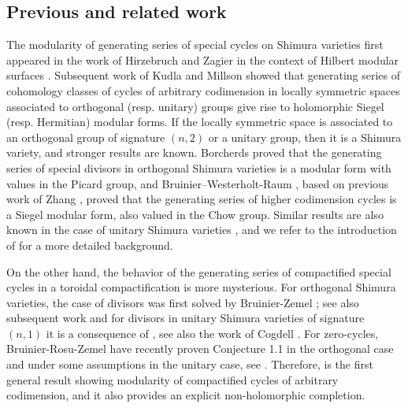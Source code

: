 \documentclass[11pt,letterpaper,english]{amsart}
\numberwithin{equation}{subsection}
\numberwithin{equation}{section}
\theoremstyle{plain}
\theoremstyle{remark}
\begin{document}
\subsection{Previous and related work}
The modularity of generating series of special cycles on Shimura varieties first appeared in the work of Hirzebruch and Zagier in the context of Hilbert modular surfaces \cite{hirzag}. Subsequent work of Kudla and Millson \cite{kudla-millson} showed that generating series of cohomology classes of cycles of arbitrary codimension in locally symmetric spaces associated to orthogonal (resp. unitary) groups give rise to holomorphic Siegel (resp. Hermitian) modular forms. If the locally symmetric space is associated to an orthogonal group of signature $(n,2)$ or a unitary group, then it is a Shimura variety, and stronger results are known. Borcherds \cite{borcherdszagier,borcherds-inventiones-automorphic} proved that the generating series of special divisors in orthogonal Shimura varieties is a modular form with values in the Picard group, and Bruinier--Westerholt-Raum \cite{Bruinier-Westerholt-Raum}, based on previous work of Zhang \cite{zhang-thesis-2009}, proved that the generating series of higher codimension cycles is a Siegel modular form, also valued in the Chow group. Similar results are also known in the case of unitary Shimura varieties \cite{xia,liu-yifeng,yuan-zhang-zhang}, and we refer to the introduction of \cite{bruinier-rosu-zemel} for a more detailed background.

On the other hand, the behavior of the generating series of compactified special cycles in a toroidal compactification is more mysterious. For orthogonal Shimura varieties, the case of divisors was first solved by Bruinier-Zemel \cite{bruinierzemel}; see also subsequent work \cite{engel-greer-tayou,garcia-modularity} and for divisors in unitary Shimura varieties of signature $(n,1)$ it is a consequence of \cite{bruinier-howard-kudla-yang}, see also the work of Cogdell \cite{Cogdell-Picard-modular}. For zero-cycles, Bruinier-Rosu-Zemel \cite{bruinier-rosu-zemel} have recently proven Conjecture 1.1 in the orthogonal case and under some assumptions in the unitary case, see \cite[Theorems 1.2, 1.3, 1.4]{bruinier-rosu-zemel}. Therefore,  is the first general result showing modularity of compactified cycles of arbitrary codimension, and it also provides an explicit non-holomorphic completion. 

\end{document}
